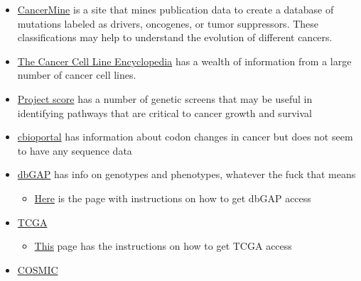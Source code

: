 \documentclass[]{book}
\providecommand{\tightlist}{%
  \setlength{\itemsep}{0pt}\setlength{\parskip}{0pt}}
\begin{document}
\begin{itemize}
\tightlist
\item
  \href{http://bionlp.bcgsc.ca/cancermine/}{CancerMine} is a site that
  mines publication data to create a database of mutations labeled as
  drivers, oncogenes, or tumor suppressors. These classifications may
  help to understand the evolution of different cancers.
\item
  \href{https://www.nature.com/articles/s41586-019-1186-3?WT.ec_id=NATURE-201905\&sap-outbound-id=720FBE4668F2FE14A299D42CB43EF50D90063A16\&mkt-key=005056A5C6311ED999AC3A52796F7641}{The
  Cancer Cell Line Encyclopedia} has a wealth of information from a
  large number of cancer cell lines.
\item
  \href{https://score.depmap.sanger.ac.uk/}{Project score} has a number
  of genetic screens that may be useful in identifying pathways that are
  critical to cancer growth and survival
\item
  \href{http://www.cbioportal.org/}{cbioportal} has information about
  codon changes in cancer but does not seem to have any sequence data
\item
  \href{https://dbgap.ncbi.nlm.nih.gov/aa/wga.cgi?page=login}{dbGAP} has
  info on genotypes and phenotypes, whatever the fuck that means

  \begin{itemize}
  \tightlist
  \item
    \href{https://dbgap.ncbi.nlm.nih.gov/aa/wga.cgi?page=login}{Here} is
    the page with instructions on how to get dbGAP access
  \end{itemize}
\item
  \href{https://www.cancer.gov/about-nci/organization/ccg/research/structural-genomics/tcga}{TCGA}

  \begin{itemize}
  \tightlist
  \item
    \href{https://gdc.cancer.gov/access-data/obtaining-access-controlled-data}{This}
    page has the instructions on how to get TCGA access
  \end{itemize}
\item
  \href{https://cancer.sanger.ac.uk/cosmic}{COSMIC}


\end{itemize}
\end{document}

